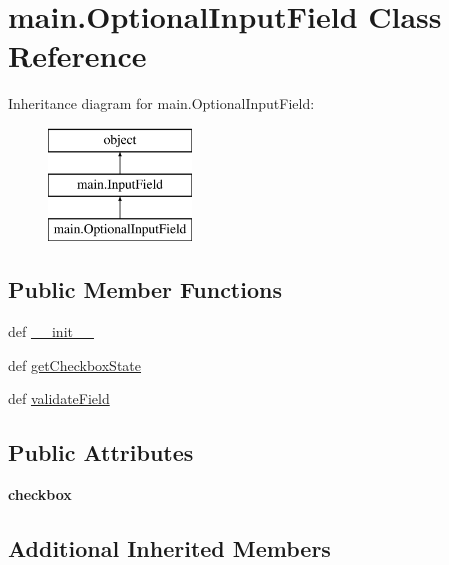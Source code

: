 \hypertarget{classmain_1_1_optional_input_field}{\section{main.\-Optional\-Input\-Field Class Reference}
\label{classmain_1_1_optional_input_field}
}
Inheritance diagram for main.\-Optional\-Input\-Field\-:\begin{figure}[H]
\begin{center}
\leavevmode
\includegraphics[height=3.000000cm]{classmain_1_1_optional_input_field}
\end{center}
\end{figure}
\subsection*{Public Member Functions}
\begin{DoxyCompactItemize}
\item 
def \hyperlink{classmain_1_1_optional_input_field_aaf9df3c86350ae96736dc45d1ec53707}{\-\_\-\-\_\-init\-\_\-\-\_\-}
\item 
def \hyperlink{classmain_1_1_optional_input_field_ae83fa806bc7265d8891cfee238ae21a7}{get\-Checkbox\-State}
\item 
def \hyperlink{classmain_1_1_optional_input_field_a83ce4c6843b285ee38f0ae2292fabba3}{validate\-Field}
\end{DoxyCompactItemize}
\subsection*{Public Attributes}
\begin{DoxyCompactItemize}
\item 
\hypertarget{classmain_1_1_optional_input_field_a04d5b6d3a2ae2f38fa14421ae8a8b05d}{{\bfseries checkbox}}\label{classmain_1_1_optional_input_field_a04d5b6d3a2ae2f38fa14421ae8a8b05d}

\end{DoxyCompactItemize}
\subsection*{Additional Inherited Members}


